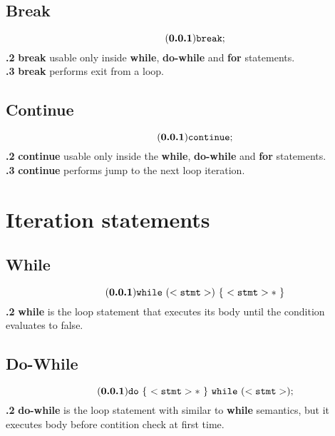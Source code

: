 \documentclass[leqno]{article}
\begin{document}
        \subsection{Break}
            \begin{equation} \tag{\textbf{\thesubsection.1}}
                \tt{break;}
            \end{equation}
            \textbf{\thesubsection.2} \textbf{break} usable only inside \textbf{while},
            \textbf{do-while} and \textbf{for} statements. \\
            \textbf{\thesubsection.3} \textbf{break} performs exit from a loop.

        \subsection{Continue}
            \begin{equation} \tag{\textbf{\thesubsection.1}}
                \tt{continue;}
            \end{equation}
            \textbf{\thesubsection.2} \textbf{continue} usable only inside the \textbf{while},
            \textbf{do-while} and \textbf{for} statements. \\
            \textbf{\thesubsection.3} \textbf{continue} performs jump to the next loop iteration.

    \section{Iteration statements}

        \subsection{While}
            \begin{equation} \tag{\textbf{\thesubsection.1}}
                \tt{while\ (<stmt>)\ \{\ <stmt>*\ \}}
            \end{equation}
            \textbf{\thesubsection.2} \textbf{while} is the loop statement that executes its
            body until the condition evaluates to false.

        \subsection{Do-While}
            \begin{equation} \tag{\textbf{\thesubsection.1}}
                \tt{do\ \{\ <stmt>*\ \} \ while\ (<stmt>);}
            \end{equation}
            \textbf{\thesubsection.2} \textbf{do-while} is the loop statement with similar to 
            \textbf{while} semantics, but it executes body before contition check at first time.
\end{document}
